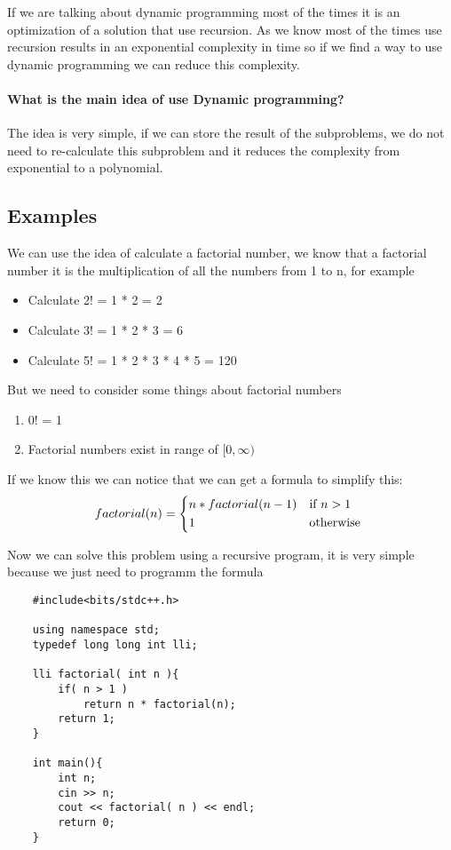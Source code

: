 If we are talking about dynamic programming most of the times it is an optimization of a solution that use recursion. As we know most of the times use recursion results in an exponential complexity in time so if we find a way to use dynamic programming we can reduce this complexity.\\

\paragraph{What is the main idea of use Dynamic programming?}
The idea is very simple, if we can store the result of the subproblems, we do not need to re-calculate this subproblem and it reduces the complexity from exponential to a polynomial. 

\subsection{Examples}
We can use the idea of calculate a factorial number, we know that a factorial number it is the multiplication of all the numbers from 1 to n, for example

\begin{itemize}
    \item { Calculate 2! = 1 * 2 = 2}
    \item { Calculate 3! = 1 * 2 * 3 = 6}
    \item { Calculate 5! = 1 * 2 * 3 * 4 * 5  = 120}
\end{itemize}

But we need to consider some things about factorial numbers
\begin{enumerate}
    \item { 0! = 1 }
    \item { Factorial numbers exist in range of $[0, \infty)$ }
\end{enumerate}

If we know this we can notice that we can get a formula to simplify this:
\[
    factorial( n ) = 
    \begin{cases*}
        n * factorial(n - 1) & if $n > 1$ \\
        1 & otherwise
    \end{cases*}
\]

Now we can solve this problem using a recursive program, it is very simple because we just need to programm the formula 
\begin{lstlisting}
    #include<bits/stdc++.h>

    using namespace std;
    typedef long long int lli;
    
    lli factorial( int n ){
        if( n > 1 )
            return n * factorial(n);
        return 1;
    }

    int main(){
        int n;
        cin >> n;
        cout << factorial( n ) << endl;
        return 0;
    }
\end{lstlisting}

